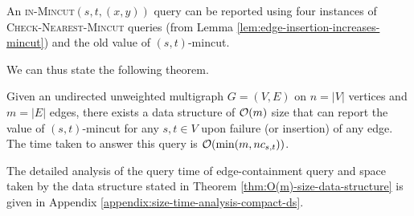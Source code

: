 An \textsc{in-Mincut}$(s,t,(x,y))$ query can be reported using four instances of \textsc{Check-Nearest-Mincut} queries (from Lemma \ref{lem:edge-insertion-increases-mincut}) and the old value of $(s,t)$-mincut.



We can thus state the following theorem.

\begin{theorem}
Given an undirected unweighted multigraph $G=(V,E)$ on $n=|V|$ vertices and $m=|E|$ edges, there exists a data structure of ${\cal O}(m)$ size that can report the value of $(s,t)$-mincut for any $s,t\in V$ upon failure (or insertion) of any edge. The time taken to answer this query is ${\cal O}(\min(m,nc_{s,t}))$.
\label{thm:O(m)-size-data-structure}
\end{theorem}

The detailed analysis of the query time of edge-containment query and space taken by the data structure stated in Theorem \ref{thm:O(m)-size-data-structure} is given in Appendix \ref{appendix:size-time-analysis-compact-ds}.



